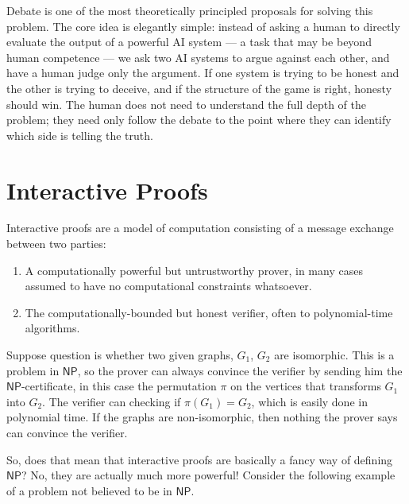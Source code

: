 \documentclass[11pt]{article}
\newcommand{\SNP}{\mathsf{NP}}
\begin{document}
Debate is one of the most theoretically principled proposals for solving this problem. The core idea is elegantly simple: instead of asking a human to directly evaluate the output of a powerful AI system — a task that may be beyond human competence — we ask two AI systems to argue against each other, and have a human judge only the argument. If one system is trying to be honest and the other is trying to deceive, and if the structure of the game is right, honesty should win. The human does not need to understand the full depth of the problem; they need only follow the debate to the point where they can identify which side is telling the truth.


\section{Interactive Proofs}

Interactive proofs are a model of computation consisting of a message exchange between two parties: 
\begin{enumerate}
 \item A computationally powerful but untrustworthy prover, in many cases assumed to have no computational constraints whatsoever.
 \item The computationally-bounded but honest verifier, often to polynomial-time algorithms.
\end{enumerate}

\begin{example}
Suppose question is whether two given graphs, $G_1$, $G_2$ are isomorphic. This is a problem in $\SNP$, so the prover can always convince the verifier by sending him the $\SNP$-certificate, in this case the permutation $\pi$ on the vertices that transforms $G_1$ into $G_2$. The verifier can checking if $\pi(G_1) = G_2$, which is easily done in polynomial time. If the graphs are non-isomorphic, then nothing the prover says can convince the verifier.
\end{example}

So, does that mean that interactive proofs are basically a fancy way of defining $\SNP$? No, they are actually much more powerful! Consider the following example of a problem not believed to be in $\SNP$.
\end{document}
